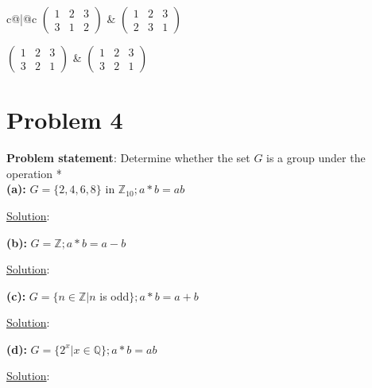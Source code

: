 \documentclass{article} %
\begin{document}
\begin{addmargin}[1em]{0em}
\begin{tabular}{c@\quad |@\quad c}
$\left( \begin{matrix} 1 & 2 & 3 \\ 3 & 1 & 2 \end{matrix} \right)$ & $\left( \begin{matrix} 1 & 2 & 3 \\ 2 & 3 & 1 \end{matrix} \right)$ \\ \rule{0pt}{5ex}
$\left( \begin{matrix} 1 & 2 & 3 \\ 3 & 2 & 1 \end{matrix} \right)$ & $\left( \begin{matrix} 1 & 2 & 3 \\ 3 & 2 & 1 \end{matrix} \right)$ 
\end{tabular}
\end{addmargin}    

\newpage

\section*{Problem 4}

\textbf{Problem statement}: Determine whether the set $G$ is a group under the operation *
\\

\textbf{(a): } $G = \{2,4,6,8\}$ in $\mathbb{Z}_{10}; a*b = ab$
\begin{addmargin}[1em]{0em}
\underline{Solution}: 
\begin{addmargin}[1em]{0em}

\end{addmargin}
\end{addmargin}
\textbf{(b): } $G = \mathbb{Z}; a * b = a - b$
\begin{addmargin}[1em]{0em}
\underline{Solution}: 
\begin{addmargin}[1em]{0em}

\end{addmargin}
\end{addmargin}
\textbf{(c): } $G = \{n \in \mathbb{Z}| n$ is odd$\}; a * b = a + b$
\begin{addmargin}[1em]{0em}
\underline{Solution}: 
\begin{addmargin}[1em]{0em}

\end{addmargin}
\end{addmargin}
\textbf{(d): } $G = \{2^x| x \in \mathbb{Q}\}; a * b = ab$
\begin{addmargin}[1em]{0em}
\underline{Solution}: 
\begin{addmargin}[1em]{0em}

\end{addmargin}
\end{addmargin}
\end{document}
